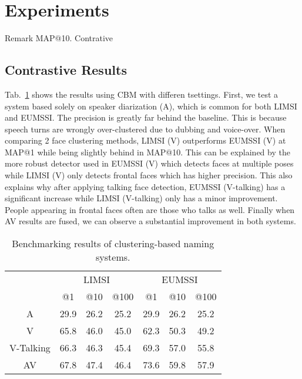 \section{Experiments}
\label{sec:experiment}

Remark MAP@10. Contrative

\subsection{Contrastive Results}

 Tab.~\ref{tab:clustering} shows the results using CBM with differen tsettings. First, we test a system based solely on speaker diarization (A), which is common for both LIMSI and EUMSSI. The precision is greatly far behind the baseline. This is because speech turns are wrongly over-clustered due to dubbing and voice-over.
%
When comparing 2 face clustering methods, LIMSI (V) outperforms EUMSSI (V) at MAP@1 while being slightly behind in MAP@10. This can be explained by the more robust detector used in EUMSSI (V) which detects faces at multiple poses while LIMSI (V) only detects frontal faces which has higher precision.
%
This also explains why after applying talking face detection, EUMSSI (V-talking) has a significant increase while LIMSI (V-talking) only has a minor improvement. People appearing in frontal faces often are those who talks as well.
%
Finally when AV results are fused, we can observe a substantial improvement in both systems.

\begin{table}[tb]
\centering
\caption{Benchmarking results of clustering-based naming systems.}
\vspace*{-2mm}
\begin{tabular}{c|c|c|c|| c|c|c|}
\cline{2-7}
  &  \multicolumn{3}{|c||}{LIMSI} &  \multicolumn{3}{|c|}{EUMSSI} \\ \cline{2-7}
           & @1& @10& @100   & @1& @10& @100 \\ \hline
 \multicolumn{1}{|c|}{A} & 29.9   & 26.2   & 25.2  & 29.9   & 26.2   & 25.2\\ \hline
 \multicolumn{1}{|c|}{V} & 65.8   & 46.0   & 45.0 & 62.3   & 50.3   & 49.2 \\ \hline
 \multicolumn{1}{|c|}{V-Talking} & 66.3   & 46.3   & 45.4 & 69.3   & 57.0   & 55.8 \\ \hline
 \multicolumn{1}{|c|}{AV} & 67.8   & 47.4   & 46.4 & 73.6   & 59.8   & 57.9\\ \hline
\end{tabular}
%
\vspace*{-5mm}
\label{tab:clustering}
\end{table}


